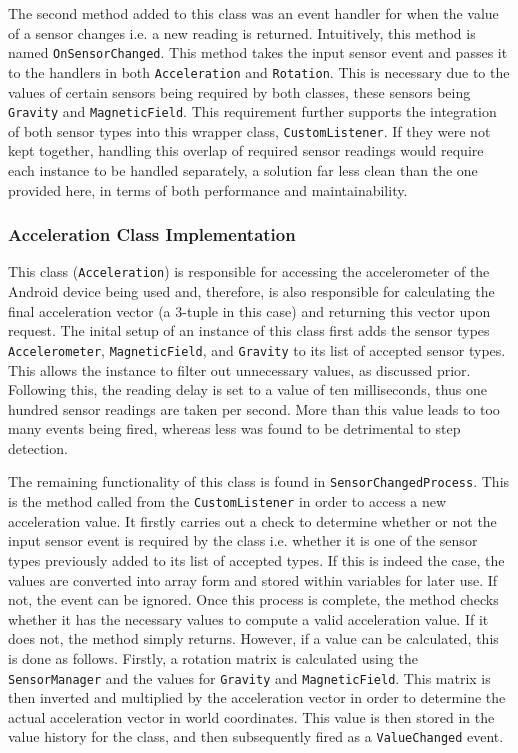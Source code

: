 \documentclass[12pt,a4paper]{report}
\begin{document}
            The second method added to this class was an event handler for when the value of a sensor changes i.e. a new reading is returned. Intuitively, this method
            is named \texttt{OnSensorChanged}. This method takes the input sensor event and passes it to the handlers in both \texttt{Acceleration} and \texttt{Rotation}.
            This is necessary due to the values of certain sensors being required by both classes, these sensors being \texttt{Gravity} and \texttt{MagneticField}. This requirement
            further supports the integration of both sensor types into this wrapper class, \texttt{CustomListener}. If they were not kept together, handling this overlap of 
            required sensor readings would require each instance to be handled separately, a solution far less clean than the one provided here, in terms of both performance and
            maintainability.
        \subsubsection{Acceleration Class Implementation}
            This class (\texttt{Acceleration}) is responsible for accessing the accelerometer of the Android device being used and, therefore, is also responsible for calculating
            the final acceleration vector (a 3-tuple in this case) and returning this vector upon request. The inital setup of an instance of this class first adds 
            the sensor types \texttt{Accelerometer}, \texttt{MagneticField}, and \texttt{Gravity} to its list of accepted sensor types. This allows the instance to filter out
            unnecessary values, as discussed prior. Following this, the reading delay is set to a value of ten milliseconds, thus one hundred sensor readings are taken per second.
            More than this value
            leads to too many events being fired, whereas less was found to be detrimental to step detection.
            
            The remaining functionality of this class is found in \texttt{SensorChangedProcess}. This is the method called from the \texttt{CustomListener} in order to access a new
            acceleration value. It firstly carries out a check to determine whether or not the input sensor event is required by the class i.e. whether it is one of the sensor types previously
            added to its list of accepted types. If this is indeed the case, the values are converted into array form and stored within variables for later use. If not, the event can
            be ignored. Once this process is complete, the method checks whether it has the necessary values to compute a valid acceleration value. If it does not, the method 
            simply returns. However, if a value can be calculated, this is done as follows. Firstly, a rotation matrix is calculated using the \texttt{SensorManager} and the
            values for \texttt{Gravity} and \texttt{MagneticField}. This matrix is then inverted and multiplied by the acceleration vector in order to determine the actual
            acceleration vector in world coordinates. This value is then stored in the value history for the class, and then subsequently fired as a \texttt{ValueChanged} event.
\end{document}
